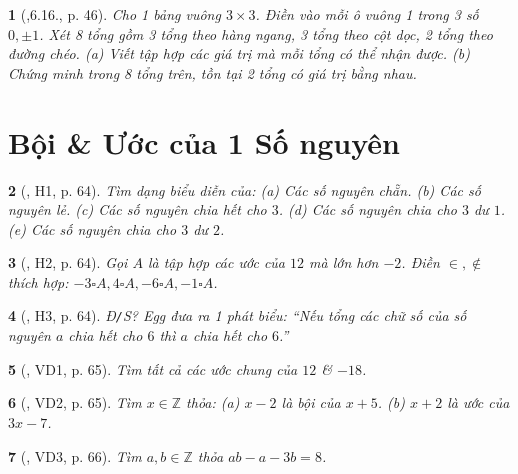 \documentclass{article}
\newtheorem{baitoan}{}
\begin{document}
\begin{baitoan}[\cite{TLCT_THCS_Toan_6_so_hoc},6.16., p. 46]
	Cho 1 bảng vuông $3\times3$. Điền vào mỗi ô vuông 1 trong 3 số $0,\pm1$. Xét 8 tổng gồm 3 tổng theo hàng ngang, 3 tổng theo cột dọc, 2 tổng theo đường chéo. (a) Viết tập hợp các giá trị mà mỗi tổng có thể nhận được. (b) Chứng minh trong 8 tổng trên, tồn tại 2 tổng có giá trị bằng nhau.
\end{baitoan}


\section{Bội \& Ước của 1 Số nguyên}

\begin{baitoan}[\cite{Binh_boi_duong_Toan_6_tap_1}, H1, p. 64]
	Tìm dạng biểu diễn của: (a) Các số nguyên chẵn. (b) Các số nguyên lẻ. (c) Các số nguyên chia hết cho $3$. (d) Các số nguyên chia cho $3$ dư $1$. (e) Các số nguyên chia cho $3$ dư $2$.
\end{baitoan}

\begin{baitoan}[\cite{Binh_boi_duong_Toan_6_tap_1}, H2, p. 64]
	Gọi $A$ là tập hợp các ước của $12$ mà lớn hơn $-2$. Điền $\in,\notin$ thích hợp: $-3\square A,4\square A,-6\square A,-1\square A$.
\end{baitoan}

\begin{baitoan}[\cite{Binh_boi_duong_Toan_6_tap_1}, H3, p. 64]
	{\rm Đ{\tt/}S?} Egg đưa ra 1 phát biểu: ``Nếu tổng các chữ số của số nguyên $a$ chia hết cho $6$ thì $a$ chia hết cho $6$.''
\end{baitoan}

\begin{baitoan}[\cite{Binh_boi_duong_Toan_6_tap_1}, VD1, p. 65]
	Tìm tất cả các ước chung của $12$ \& $-18$.
\end{baitoan}

\begin{baitoan}[\cite{Binh_boi_duong_Toan_6_tap_1}, VD2, p. 65]
	Tìm $x\in\mathbb{Z}$ thỏa: (a) $x - 2$ là bội của $x + 5$. (b) $x + 2$ là ước của $3x - 7$.
\end{baitoan}

\begin{baitoan}[\cite{Binh_boi_duong_Toan_6_tap_1}, VD3, p. 66]
	Tìm $a,b\in\mathbb{Z}$ thỏa $ab - a - 3b = 8$.
\end{baitoan}
\end{document}
